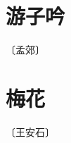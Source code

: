\documentclass[12pt,UTF-8,openany]{ctexbook}
\begin{document}
\vspace{8pt}


\section{游子吟}

\begin{center}
    \vspace{10pt}
    
    \begin{normalsize}
        
        〔孟郊〕
        
    \end{normalsize}
    
    \vspace{8pt}
    
    \begin{large}
        
        
        
        
    \end{large}
    
\end{center}

\vspace{8pt}


\section{梅花}

\begin{center}
    \vspace{10pt}
    
    \begin{normalsize}
        
        〔王安石〕
        
    \end{normalsize}
    
    \vspace{8pt}
    
    \begin{large}
        
        
        
    \end{large}
    
\end{center}
\end{document}
